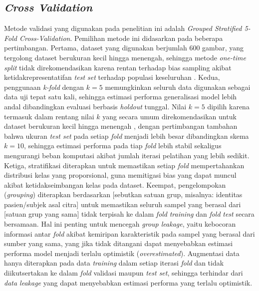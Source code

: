 \subsection{\textit{Cross Validation}}
Metode validasi yang digunakan pada penelitian ini adalah \textit{Grouped Stratified 5-Fold Cross-Validation}. Pemilihan metode ini didasarkan pada beberapa pertimbangan. Pertama, dataset yang digunakan berjumlah 600 gambar, yang tergolong dataset berukuran kecil hingga menengah, sehingga metode \textit{one-time split} tidak direkomendasikan karena rentan terhadap bias sampling akibat ketidakrepresentatifan \textit{test set} terhadap populasi keseluruhan \cite{bradshaw2023guide}. Kedua, penggunaan \textit{k-fold} dengan $k = 5$ memungkinkan seluruh data digunakan sebagai data uji tepat satu kali, sehingga estimasi performa generalisasi model lebih andal dibandingkan evaluasi berbasis \textit{holdout} tunggal. Nilai $k = 5$ dipilih karena termasuk dalam rentang nilai $k$ yang secara umum direkomendasikan untuk dataset berukuran kecil hingga menengah \cite{bradshaw2023guide}, dengan pertimbangan tambahan bahwa ukuran \textit{test set} pada setiap \textit{fold} menjadi lebih besar dibandingkan skema $k = 10$, sehingga estimasi performa pada tiap \textit{fold} lebih stabil sekaligus mengurangi beban komputasi akibat jumlah iterasi pelatihan yang lebih sedikit. Ketiga, stratifikasi diterapkan untuk memastikan setiap \textit{fold} mempertahankan distribusi kelas yang proporsional, guna memitigasi bias yang dapat muncul akibat ketidakseimbangan kelas pada dataset. Keempat, pengelompokan (\textit{grouping}) diterapkan berdasarkan [sebutkan satuan grup, misalnya: identitas pasien/subjek asal citra] untuk memastikan seluruh sampel yang berasal dari [satuan grup yang sama] tidak terpisah ke dalam \textit{fold} \textit{training} dan \textit{fold} \textit{test} secara bersamaan. Hal ini penting untuk mencegah \textit{group leakage}, yaitu kebocoran informasi antar \textit{fold} akibat kemiripan karakteristik pada sampel yang berasal dari sumber yang sama, yang jika tidak ditangani dapat menyebabkan estimasi performa model menjadi terlalu optimistik (\textit{overestimated}). Augmentasi data hanya diterapkan pada data \textit{training} dalam setiap iterasi \textit{fold} dan tidak diikutsertakan ke dalam \textit{fold} validasi maupun \textit{test set}, sehingga terhindar dari \textit{data leakage} yang dapat menyebabkan estimasi performa yang terlalu optimistik.

